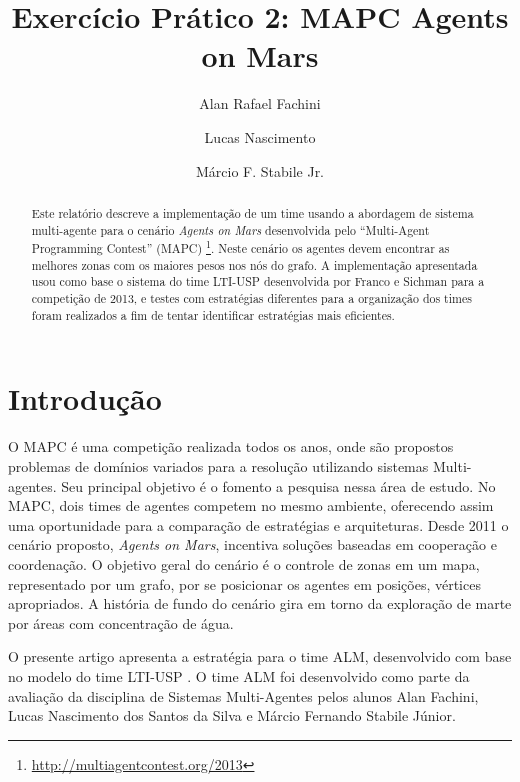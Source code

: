 \documentclass{llncs}
\begin{document}
\title{Exercício Prático 2: MAPC Agents on Mars}

\author{Alan Rafael Fachini \and Lucas Nascimento \and Márcio F. Stabile Jr.}

\maketitle

\begin{abstract}
Este relatório descreve a implementação de um time usando a abordagem de sistema multi-agente para o cenário \textit{Agents on Mars} desenvolvida pelo ``Multi-Agent Programming Contest'' (MAPC) \footnote{\url{http://multiagentcontest.org/2013}}. Neste cenário os agentes devem encontrar as melhores zonas com os maiores pesos nos nós do grafo. A implementação apresentada usou como base o sistema do time LTI-USP desenvolvida por Franco e Sichman \cite{franco2013improving} para a competição de 2013, e testes com estratégias diferentes para a organização dos times foram realizados a fim de tentar identificar estratégias mais eficientes.
\end{abstract}

\section{Introdução}

O MAPC é uma competição realizada todos os anos, onde são propostos problemas de domínios variados para a resolução utilizando sistemas Multi-agentes. Seu principal objetivo é o fomento a pesquisa nessa área de estudo. No MAPC, dois times de agentes competem no mesmo ambiente, oferecendo assim uma oportunidade para a comparação de estratégias e arquiteturas. Desde 2011 o cenário proposto, \textit{Agents on Mars}, incentiva soluções baseadas em cooperação e coordenação. O objetivo geral do cenário é o controle de zonas em um mapa, representado por um grafo, por se posicionar os agentes em posições, vértices apropriados. A história de fundo do cenário gira em torno da exploração de marte por áreas com concentração de água.

O presente artigo apresenta a estratégia para o time ALM, desenvolvido com base no modelo do time LTI-USP \cite{franco2013comparing}\cite{franco2013improving}\cite{ltiusp2012}. O time ALM foi desenvolvido como parte da avaliação da disciplina de Sistemas Multi-Agentes pelos alunos Alan Fachini, Lucas Nascimento dos Santos da Silva e Márcio Fernando Stabile Júnior.
\end{document}
